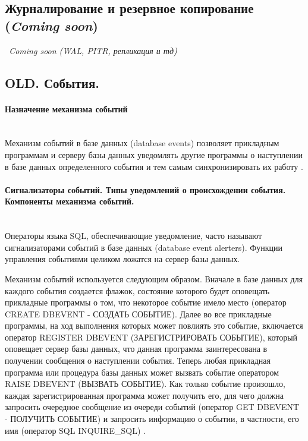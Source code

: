 \subsection{Журналирование и резервное копирование (\textit{Coming soon})}

\textit{~Coming soon (WAL, PITR, репликация и тд)}



\subsection{OLD. События.}

\paragraph{Назначение механизма событий} ~\\

Механизм событий в базе данных (database events) позволяет прикладным программам и серверу базы данных уведомлять другие программы о наступлении в базе данных определенного события и тем самым синхронизировать их работу \autocite{OSP}.

\paragraph{Сигнализаторы событий. Типы уведомлений о происхождении события. Компоненты механизма событий.} ~\\

Операторы языка SQL, обеспечивающие уведомление, часто называют сигнализаторами событий в базе данных (database event alerters). Функции управления событиями целиком ложатся на сервер базы данных.


Механизм событий используется следующим образом. Вначале в базе данных для каждого события создается флажок, состояние которого будет оповещать прикладные программы о том, что некоторое событие имело место (оператор CREATE DBEVENT - СОЗДАТЬ СОБЫТИЕ). Далее во все прикладные программы, на ход выполнения которых может повлиять это событие, включается оператор REGISTER DBEVENT (ЗАРЕГИСТРИРОВАТЬ СОБЫТИЕ), который оповещает сервер базы данных, что данная программа заинтересована в получении сообщения о наступлении события. Теперь любая прикладная программа или процедура базы данных может вызвать событие оператором RAISE DBEVENT (ВЫЗВАТЬ СОБЫТИЕ). Как только событие произошло, каждая зарегистрированная программа может получить его, для чего должна запросить очередное сообщение из очереди событий (оператор GET DBEVENT - ПОЛУЧИТЬ СОБЫТИЕ) и запросить информацию о событии, в частности, его имя (оператор SQL INQUIRE\_SQL) \autocite{OSP}.
